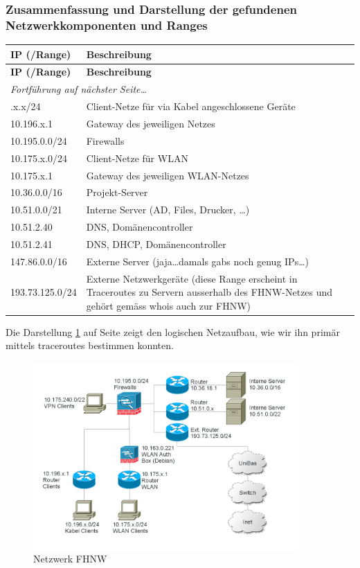 \documentclass[a4paper,11pt]{scrartcl}
\begin{document}
\subsubsection{Zusammenfassung und Darstellung der gefundenen Netzwerkkomponenten und Ranges}
\begin{longtable}{p{3cm}|p{9cm}}
	\textbf{IP (/Range)} & \textbf{Beschreibung} \\
	\hline
	\endfirsthead
	\textbf{IP (/Range)} & \textbf{Beschreibung} \\
	\hline
	\endhead
	\hline
	\multicolumn{2}{l}{\textit{Fortführung auf nächster Seite\ldots}} \\
	\endfoot
	\endlastfoot
	10.196.x.x/24	&	Client-Netze für via Kabel angeschlossene Geräte \\
	10.196.x.1		&	Gateway des jeweiligen Netzes \\
	10.195.0.0/24	&	Firewalls \\
	10.175.x.0/24	&	Client-Netze für WLAN \\
	10.175.x.1		&	Gateway des jeweiligen WLAN-Netzes \\
	10.36.0.0/16	&	Projekt-Server \\
	10.51.0.0/21	&	Interne Server (AD, Files, Drucker, \ldots) \\
	10.51.2.40		&	DNS, Domänencontroller \\
	10.51.2.41		&	DNS, DHCP, Domänencontroller \\
	147.86.0.0/16	&	Externe Server (jaja\ldots damals gabs noch genug IPs\ldots)\\
	193.73.125.0/24	&	Externe Netzwerkgeräte (diese Range erscheint in Traceroutes zu Servern ausserhalb des FHNW-Netzes und gehört gemäss whois auch zur FHNW)
\end{longtable}

Die Darstellung \ref{fig:netzplan} auf Seite \pageref{fig:netzplan} zeigt den logischen Netzaufbau, wie wir ihn primär mittels traceroutes bestimmen konnten.
\begin{figure}[h]
	\centering
	\includegraphics[width=0.9\textwidth]{../aufg5/netzplan.png}
	\caption{Netzwerk FHNW}
	\label{fig:netzplan}
\end{figure}
\end{document}
